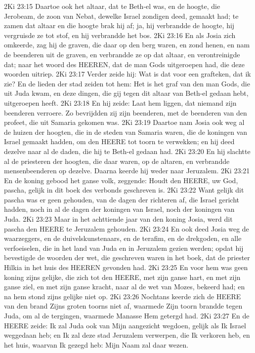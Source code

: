 2Ki 23:15  Daartoe ook het altaar, dat te Beth-el was, en de hoogte, die Jerobeam, de zoon van Nebat, dewelke Israel zondigen deed, gemaakt had; te zamen dat altaar en die hoogte brak hij af; ja, hij verbrandde de hoogte, hij vergruisde ze tot stof, en hij verbrandde het bos.
2Ki 23:16  En als Josia zich omkeerde, zag hij de graven, die daar op den berg waren, en zond henen, en nam de beenderen uit de graven, en verbrandde ze op dat altaar, en verontreinigde dat; naar het woord des HEEREN, dat de man Gods uitgeroepen had, die deze woorden uitriep.
2Ki 23:17  Verder zeide hij: Wat is dat voor een grafteken, dat ik zie? En de lieden der stad zeiden tot hem: Het is het graf van den man Gods, die uit Juda kwam, en deze dingen, die gij tegen dit altaar van Beth-el gedaan hebt, uitgeroepen heeft.
2Ki 23:18  En hij zeide: Laat hem liggen, dat niemand zijn beenderen verroere. Zo bevrijdden zij zijn beenderen, met de beenderen van den profeet, die uit Samaria gekomen was.
2Ki 23:19  Daartoe nam Josia ook weg al de huizen der hoogten, die in de steden van Samaria waren, die de koningen van Israel gemaakt hadden, om den HEERE tot toorn te verwekken; en hij deed dezelve naar al de daden, die hij te Beth-el gedaan had.
2Ki 23:20  En hij slachtte al de priesteren der hoogten, die daar waren, op de altaren, en verbrandde mensenbeenderen op dezelve. Daarna keerde hij weder naar Jeruzalem.
2Ki 23:21  En de koning gebood het ganse volk, zeggende: Houdt den HEERE, uw God, pascha, gelijk in dit boek des verbonds geschreven is.
2Ki 23:22  Want gelijk dit pascha was er geen gehouden, van de dagen der richteren af, die Israel gericht hadden, noch in al de dagen der koningen van Israel, noch der koningen van Juda.
2Ki 23:23  Maar in het achttiende jaar van den koning Josia, werd dit pascha den HEERE te Jeruzalem gehouden.
2Ki 23:24  En ook deed Josia weg de waarzeggers, en de duivelskunstenaars, en de terafim, en de drekgoden, en alle verfoeiselen, die in het land van Juda en in Jeruzalem gezien werden; opdat hij bevestigde de woorden der wet, die geschreven waren in het boek, dat de priester Hilkia in het huis des HEEREN gevonden had.
2Ki 23:25  En voor hem was geen koning zijns gelijke, die zich tot den HEERE, met zijn ganse hart, en met zijn ganse ziel, en met zijn ganse kracht, naar al de wet van Mozes, bekeerd had; en na hem stond zijns gelijke niet op.
2Ki 23:26  Nochtans keerde zich de HEERE van den brand Zijns groten toorns niet af, waarmede Zijn toorn brandde tegen Juda, om al de tergingen, waarmede Manasse Hem getergd had.
2Ki 23:27  En de HEERE zeide: Ik zal Juda ook van Mijn aangezicht wegdoen, gelijk als Ik Israel weggedaan heb; en Ik zal deze stad Jeruzalem verwerpen, die Ik verkoren heb, en het huis, waarvan Ik gezegd heb: Mijn Naam zal daar wezen.

